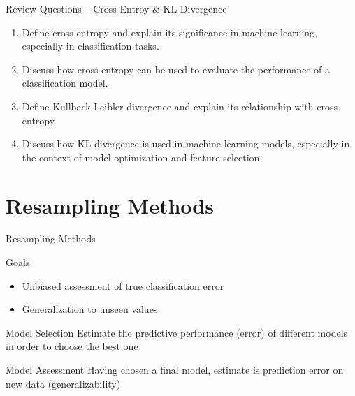 \documentclass[ignorenonframetext,xcolor=x11names]{beamer}
\begin{document}
\begin{frame}{Review Questions -- Cross-Entroy \& KL Divergence}
\begin{enumerate}
  \item Define cross-entropy and explain its significance in machine learning, especially in classification tasks.
  \item Discuss how cross-entropy can be used to evaluate the performance of a classification model.
  \item Define Kullback-Leibler divergence and explain its relationship with cross-entropy.
  \item Discuss how KL divergence is used in machine learning models, especially in the context of model optimization and feature selection.
\end{enumerate}
\end{frame}

\section{Resampling Methods}

\begin{frame}{Resampling Methods}
\begin{block}{Goals}
\begin{itemize}
  \item Unbiased assessment of true classification error
  \item Generalization to unseen values
\end{itemize}
\end{block}

\begin{block}{Model Selection}
Estimate the predictive performance (error) of different models in order to choose the best one
\end{block}

\begin{block}{Model Assessment}
Having chosen a final model, estimate is prediction error on new data (generalizability)
\end{block}
\end{frame}
\end{document}
